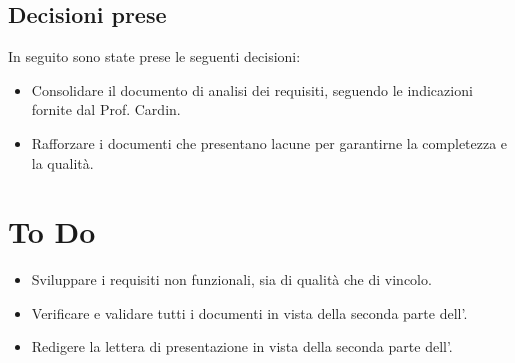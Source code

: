 \documentclass[a4paper, 12pt]{article}
\begin{document}
\subsection{Decisioni prese}
In seguito sono state prese le seguenti decisioni:
\begin{itemize}
    \item Consolidare il documento di analisi dei requisiti, seguendo le indicazioni fornite dal Prof. Cardin.
    \item Rafforzare i documenti che presentano lacune per garantirne la completezza e la qualità.
\end{itemize}

\section{To Do}
\begin{itemize}
    \item Sviluppare i requisiti non funzionali, sia di qualità che di vincolo.
    \item Verificare e validare tutti i documenti in vista della seconda parte dell'.
    \item Redigere la lettera di presentazione in vista della seconda parte dell'.
\end{itemize}
\end{document}
